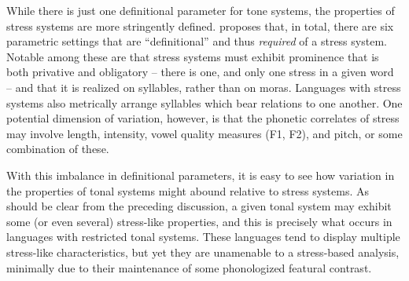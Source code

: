 \documentclass[output=paper,colorlinks,citecolor=brown]{langscibook}
\begin{document}
While there is just one definitional parameter for tone systems, the properties of stress systems are more stringently defined. \citet{Hyman2009} proposes that, in total, there are six parametric settings that are ``definitional'' and thus \textit{required} of a stress system. Notable among these are that stress systems must exhibit prominence that is both  privative and  obligatory -- there is one, and only one stress in a given word -- and that it is realized on syllables, rather than on moras. Languages with stress systems also  metrically arrange syllables which bear  relations to one another. One potential dimension of variation, however, is that the phonetic correlates of stress may involve length, intensity, vowel quality measures (F1, F2), and pitch, or some combination of these. 

With this imbalance in definitional parameters, it is easy to see how variation in the properties of tonal systems might abound relative to stress systems. As should be clear from the preceding discussion, a given tonal system may exhibit some (or even several) stress-like properties, and this is precisely what occurs in languages with restricted tonal systems. These languages tend to display multiple stress-like characteristics, but yet they are unamenable to a stress-based analysis, minimally due to their maintenance of some phonologized featural contrast.



\end{document}
